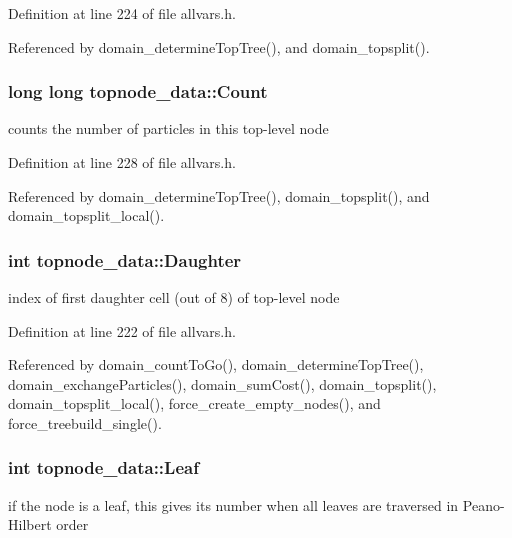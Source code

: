 Definition at line 224 of file allvars.h.



Referenced by domain\_\-determineTopTree(), and domain\_\-topsplit().

\hypertarget{structtopnode__data_a3cae714f1f71f6ce4750004ee6fbda06}{
\subsubsection[{Count}]{\setlength{\rightskip}{0pt plus 5cm}long long {\bf topnode\_\-data::Count}}}
\label{structtopnode__data_a3cae714f1f71f6ce4750004ee6fbda06}
counts the number of particles in this top-\/level node 

Definition at line 228 of file allvars.h.



Referenced by domain\_\-determineTopTree(), domain\_\-topsplit(), and domain\_\-topsplit\_\-local().

\hypertarget{structtopnode__data_ad2e76e39d74f3c299b38fa680ecdb794}{
\subsubsection[{Daughter}]{\setlength{\rightskip}{0pt plus 5cm}int {\bf topnode\_\-data::Daughter}}}
\label{structtopnode__data_ad2e76e39d74f3c299b38fa680ecdb794}
index of first daughter cell (out of 8) of top-\/level node 

Definition at line 222 of file allvars.h.



Referenced by domain\_\-countToGo(), domain\_\-determineTopTree(), domain\_\-exchangeParticles(), domain\_\-sumCost(), domain\_\-topsplit(), domain\_\-topsplit\_\-local(), force\_\-create\_\-empty\_\-nodes(), and force\_\-treebuild\_\-single().

\hypertarget{structtopnode__data_aa5c48f2ae0bd1e2ed8ca069e4eeb29cd}{
\subsubsection[{Leaf}]{\setlength{\rightskip}{0pt plus 5cm}int {\bf topnode\_\-data::Leaf}}}
\label{structtopnode__data_aa5c48f2ae0bd1e2ed8ca069e4eeb29cd}
if the node is a leaf, this gives its number when all leaves are traversed in Peano-\/Hilbert order 

